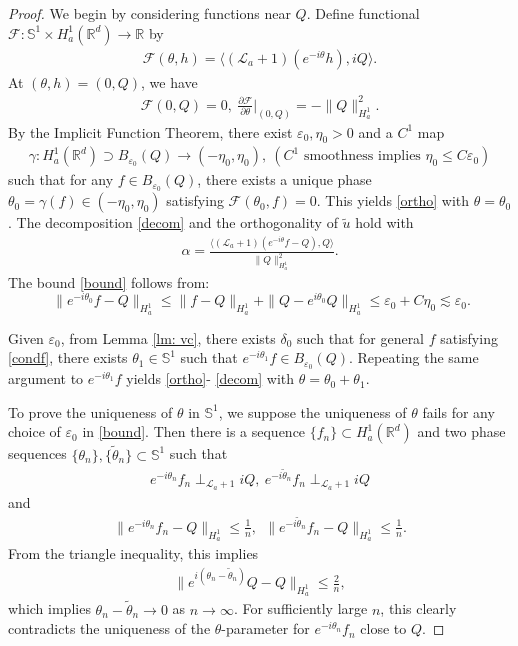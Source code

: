 \documentclass[12pt]{amsart}
\newcommand{\R}{\mathbb R}
\newcommand{\eps}{\varepsilon}
\newcommand{\la}{\mathcal L_a}
\newcommand{\nha}{H^1_a}
\begin{document}
\begin{proof} We begin by considering functions near $Q$. 
Define functional $\mathcal F: \mathbb S^1\times \nha(\R^d)\to \R$ by  
\begin{align*}
\mathcal F(\theta, h)=\langle(\la+1)(e^{-i\theta}h), iQ\rangle.
\end{align*}
At $(\theta, h)=(0,Q)$, we have
\begin{align*}
\mathcal F(0, Q)=0, \ \frac{\partial \mathcal F}{\partial \theta}\biggr|_{(0, Q)}=-\|Q\|_{\nha}^2.
\end{align*}
By the Implicit Function Theorem, there exist $\eps_0, \eta_0>0$ and a $C^1$ map
\begin{align*}
\gamma: \nha(\R^d)\supset B_{{\eps_0}}(Q)\to (-\eta_0, \eta_0), \ ( C^1\mbox{ smoothness implies } \eta_0\le C \eps_0 )
\end{align*}
such that for any $f\in B_{{\eps_0}}(Q)$, there exists a unique phase $\theta_0=\gamma(f)\in (-\eta_0,\eta_0)$ satisfying 
$
\mathcal F(\theta_0, f)=0. 
$
This yields \eqref{ortho} with $\theta=\theta_0$. The decomposition \eqref{decom} and the orthogonality of $\tilde u$ hold with 
\begin{align}\label{339}
 \alpha=\frac{\langle(\la+1)(e^{-i\theta}f-Q),Q\rangle }{\|Q\|_{\nha}^2}.
\end{align}
The bound \eqref{bound} follows from:
\[
\ \| e^{-i\theta_0}f-Q\|_{\nha}\le \|f-Q\|_{\nha}+\|Q-e^{i\theta_0}Q\|_{\nha}\le {\eps_0}+C\eta_0\lesssim \eps_0.
\]

Given $\varepsilon_0$, from Lemma \ref{lm: vc}, there exists $\delta_0$ such that for general $f$ satisfying \eqref{condf}, there exists $\theta_1\in \mathbb S^1$ such that $e^{-i\theta_1}f\in B_{{\eps_0}}(Q)$. Repeating the same argument to $e^{-i\theta_1} f$ yields \eqref{ortho}- \eqref{decom} with $\theta=\theta_0+\theta_1$. 


To prove the uniqueness of $\theta$ in $\mathbb S^1$, we suppose the uniqueness of $\theta$ fails for any choice of $\eps_0$ in \eqref{bound}. Then there is a sequence $\{f_n\}\subset \nha(\R^d)$ and two phase sequences $\{\theta_n\}, \{\tilde \theta_n\}\subset \mathbb S^1$ such that 
\begin{align*}
e^{-i\theta_n}f_n\perp_{\la+1}iQ,\ e^{-i\tilde\theta_n}f_n\perp_{\la+1} iQ
\end{align*}
and 
\begin{align*}
\|e^{-i\theta_n}f_n-Q\|_{\nha}\le \frac 1n, \ \ \|e^{-i\tilde \theta_n}f_n-Q\|_{\nha}\le \frac 1n. 
\end{align*}
From the triangle inequality, this implies 
\begin{align*}
\|e^{i(\theta_n-\tilde \theta_n)}Q-Q\|_{\nha}\le \frac 2n, 
\end{align*}
which implies $\theta_n-\tilde \theta_n\to 0$ as $n\to \infty$. For sufficiently large $n$, this clearly contradicts the uniqueness of the $\theta$-parameter for $e^{-i \theta_n} f_n$ close to $Q$.


\end{proof}
\end{document}
